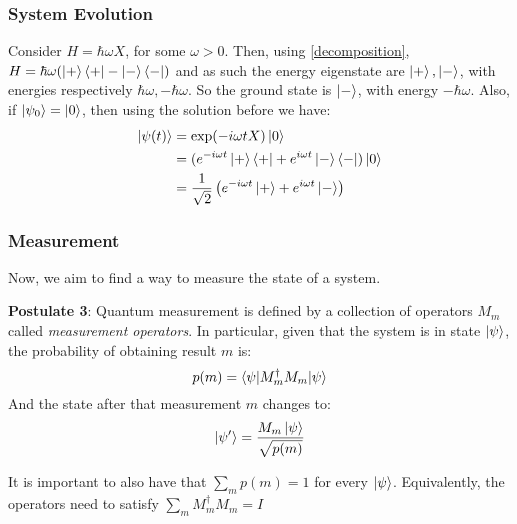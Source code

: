 \documentclass{beamer}
\begin{document}
    \begin{frame}
        \frametitle{System Evolution}
        \begin{example}
            Consider $H = \hbar \omega X$, for some $\omega > 0$. Then, using \ref{decomposition}, $H = \hbar \omega (\ket{+}\bra{+} - \ket{-}\bra{-})$
            and as such the energy eigenstate are $\ket{+}, \ket{-}$, with energies respectively $\hbar \omega, -\hbar\omega$.
            So the ground state is $\ket{-}$, with energy $-\hbar\omega$.
            Also, if $\ket{\psi_0} = \ket{0}$, then using the solution before we have:
            \begin{align}
                \ket{\psi(t)} &= \exp(-i \omega t X)\ket{0} \\
                &= (e^{-i \omega t} \ket{+}\bra{+} + e^{i \omega t} \ket{-}\bra{-})\ket{0} \\
                &= \frac{1}{\sqrt{2}} \left(e^{-i \omega t} \ket{+} + e^{i \omega t} \ket{-}\right) 
            \end{align}
        \end{example}
    \end{frame}
    \begin{frame}
        \frametitle{Measurement}
        Now, we aim to find a way to measure the state of a system.
        \begin{definition}
            \textbf{Postulate 3}: Quantum measurement is defined by a collection of operators
            ${M_m}$ called \textit{measurement operators}. In particular, given that the system is 
            in state $\ket{\psi}$, the probability of obtaining result $m$ is:
            \begin{equation}
                p(m) = \braket{\psi|M_m^\dagger M_m|\psi}
            \end{equation}
            And the state after that measurement $m$ changes to:
            \begin{equation}
                \ket{\psi'} = \frac{M_m \ket{\psi}}{\sqrt{p(m)}}
            \end{equation}
        \end{definition}
        It is important to also have that $\sum_m p(m) = 1$ for every $\ket{\psi}$. 
        Equivalently, the operators need to satisfy $\sum_m M_m^\dagger M_m = I$
    \end{frame}
\end{document}
